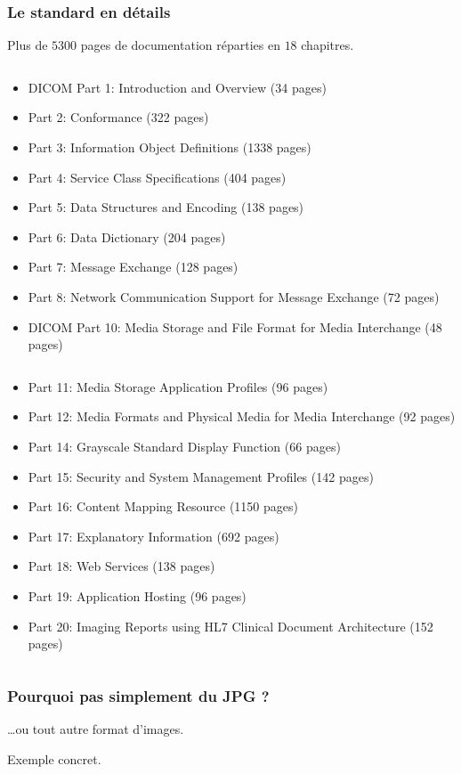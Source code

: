 	\frame
	{
		\frametitle{Le standard en d\'etails}
		Plus de $5300$ pages de documentation r\'eparties en $18$ chapitres.
		
		\begin{columns}\begin{scriptsize}
	  	\begin{column}[t]{0.5\linewidth}
			\begin{itemize}
				\item DICOM Part 1: Introduction and Overview (34 pages)
				\item Part 2: Conformance (322 pages)
				\item Part 3: Information Object Definitions (1338 pages)
				\item Part 4: Service Class Specifications (404 pages)
				\item Part 5: Data Structures and Encoding (138 pages)
				\item Part 6: Data Dictionary (204 pages)
				\item Part 7: Message Exchange (128 pages)
				\item Part 8: Network Communication Support for Message Exchange (72 pages)
				\item DICOM Part 10: Media Storage and File Format for Media Interchange (48 pages)
			\end{itemize}
	  	\end{column}
	  	\begin{column}[t]{0.5\linewidth}
			\begin{itemize}
				\item Part 11: Media Storage Application Profiles (96 pages)
				\item Part 12: Media Formats and Physical Media for Media Interchange (92 pages)
				\item Part 14: Grayscale Standard Display Function (66 pages)
				\item Part 15: Security and System Management Profiles (142 pages)
				\item Part 16: Content Mapping Resource (1150 pages)
				\item Part 17: Explanatory Information (692 pages)
				\item Part 18: Web Services (138 pages)
				\item Part 19: Application Hosting (96 pages)
				\item Part 20: Imaging Reports using HL7 Clinical Document Architecture (152 pages)
			\end{itemize}
	  	\end{column}\end{scriptsize}
	  	\end{columns}
	}

	\frame
	{
		\frametitle{Pourquoi pas simplement du JPG ?}
		\ldots ou tout autre format d'images.

		Exemple concret.
	}

